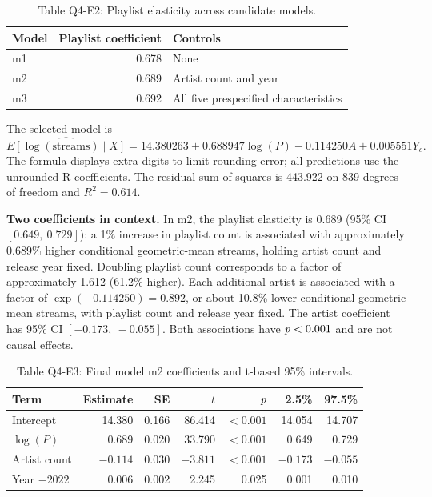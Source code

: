 \begin{table}[htbp]\centering
\caption*{Table Q4-E2: Playlist elasticity across candidate models.}
\begin{tabular}{lrl}\toprule
Model & Playlist coefficient & Controls \\\midrule
m1 & 0.678 & None \\
m2 & 0.689 & Artist count and year \\
m3 & 0.692 & All five prespecified characteristics \\\bottomrule
\end{tabular}\end{table}

The selected model is
\[
\widehat{E[\log(\text{streams})\mid X]}=
14.380263+0.688947\log(P)-0.114250A+0.005551Y_c.
\]
The formula displays extra digits to limit rounding error; all predictions use the unrounded R coefficients. The residual sum of squares is 443.922 on 839 degrees of freedom and $R^2=0.614$.

\textbf{Two coefficients in context.} In m2, the playlist elasticity is 0.689 (95\% CI $[0.649,\ 0.729]$): a 1\% increase in playlist count is associated with approximately 0.689\% higher conditional geometric-mean streams, holding artist count and release year fixed. Doubling playlist count corresponds to a factor of approximately 1.612 (61.2\% higher). Each additional artist is associated with a factor of $\exp(-0.114250)=0.892$, or about 10.8\% lower conditional geometric-mean streams, with playlist count and release year fixed. The artist coefficient has 95\% CI $[-0.173,\ -0.055]$. Both associations have $\mathit{p}<0.001$ and are not causal effects.

\begin{table}[htbp]\centering\small
\caption*{Table Q4-E3: Final model m2 coefficients and t-based 95\% intervals.}
\begin{tabular}{lrrrrrr}\toprule
Term & Estimate & SE & $t$ & $\mathit{p}$ & 2.5\% & 97.5\% \\\midrule
Intercept & 14.380 & 0.166 & 86.414 & $<0.001$ & 14.054 & 14.707 \\
$\log(P)$ & 0.689 & 0.020 & 33.790 & $<0.001$ & 0.649 & 0.729 \\
Artist count & $-0.114$ & 0.030 & $-3.811$ & $<0.001$ & $-0.173$ & $-0.055$ \\
Year $-2022$ & 0.006 & 0.002 & 2.245 & 0.025 & 0.001 & 0.010 \\\bottomrule
\end{tabular}\end{table}

